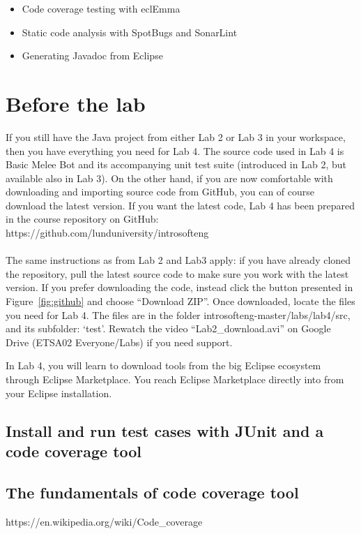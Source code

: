 \documentclass{scrreprt}
\begin{document}
\begin{itemize}
\item Code coverage testing with eclEmma
\item Static code analysis with SpotBugs and SonarLint
\item Generating Javadoc from Eclipse
\end{itemize}

\chapter{Before the lab}
If you still have the Java project from either Lab 2 or Lab 3 in your workspace, then you have everything you need for Lab 4. The source code used in Lab 4 is Basic Melee Bot and its accompanying unit test suite (introduced in Lab 2, but available also in Lab 3). On the other hand, if you are now comfortable with downloading and importing source code from GitHub, you can of course download the latest version. If you want the latest code, Lab 4 has been prepared in the course repository on GitHub:\\https://github.com/lunduniversity/introsofteng\\\\
The same instructions as from Lab 2 and Lab3 apply: if you have already cloned the repository, pull the latest source code to make sure you work with the latest version. If you prefer downloading the code, instead click the button presented in Figure~\ref{fig:github} and choose ``Download ZIP''. Once downloaded, locate the files you need for Lab 4. The files are in the folder introsofteng-master/labs/lab4/src, and its subfolder: `test'. Rewatch the video ``Lab2_download.avi'' on Google Drive (ETSA02 Everyone/Labs) if you need support.

In Lab 4, you will learn to download tools from the big Eclipse ecosystem through Eclipse Marketplace. You reach Eclipse Marketplace directly into from your Eclipse installation. 

\section{Install and run test cases with JUnit and a code coverage tool}

\section{The fundamentals of code coverage tool}

https://en.wikipedia.org/wiki/Code_coverage
\end{document}

